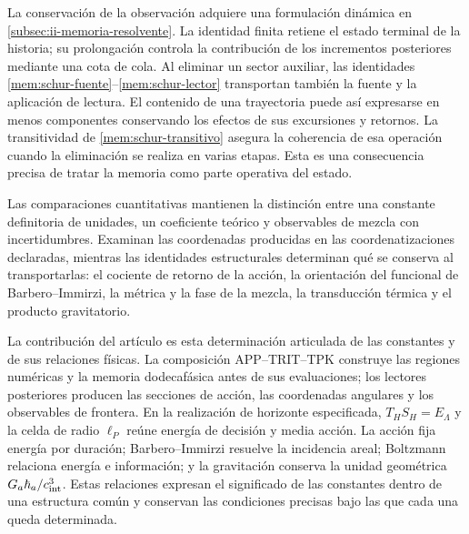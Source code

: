 La conservación de la observación adquiere una formulación dinámica en
\ref{subsec:ii-memoria-resolvente}. La identidad finita retiene el estado
terminal de la historia; su prolongación controla la contribución de
los incrementos posteriores mediante una cota de cola. Al eliminar
un sector auxiliar, las identidades
\eqref{mem:schur-fuente}--\eqref{mem:schur-lector} transportan también
la fuente y la aplicación de lectura. El contenido de una trayectoria
puede así expresarse en menos componentes conservando los efectos de
sus excursiones y retornos. La transitividad de
\eqref{mem:schur-transitivo} asegura la coherencia de esa operación
cuando la eliminación se realiza en varias etapas. Esta es una
consecuencia precisa de tratar la memoria como parte operativa del estado.



Las comparaciones cuantitativas mantienen la distinción entre una
constante definitoria de unidades, un coeficiente teórico y observables
de mezcla con incertidumbres. Examinan las coordenadas producidas en
las coordenatizaciones declaradas, mientras las identidades estructurales determinan
qué se conserva al transportarlas: el cociente de retorno de la acción,
la orientación del funcional de Barbero--Immirzi, la métrica y la fase
de la mezcla, la transducción térmica y el producto gravitatorio.

La contribución del artículo es esta determinación articulada de las
constantes y de sus relaciones físicas. La composición APP--TRIT--TPK
construye las regiones numéricas y la memoria dodecafásica antes de sus
evaluaciones; los lectores posteriores producen las secciones de acción,
las coordenadas angulares y los observables de frontera. En la realización
de horizonte especificada, \(T_HS_H=E_\Lambda\) y la celda de radio
\(\ell_P\) reúne energía de decisión y media acción. La acción fija
energía por duración; Barbero--Immirzi resuelve la incidencia areal;
Boltzmann relaciona energía e información; y la gravitación conserva
la unidad geométrica \(G_a\hbar_a/c_{\rm int}^3\).
Estas relaciones expresan el significado de las constantes dentro de
una estructura común y conservan las condiciones precisas bajo las que
cada una queda determinada.
